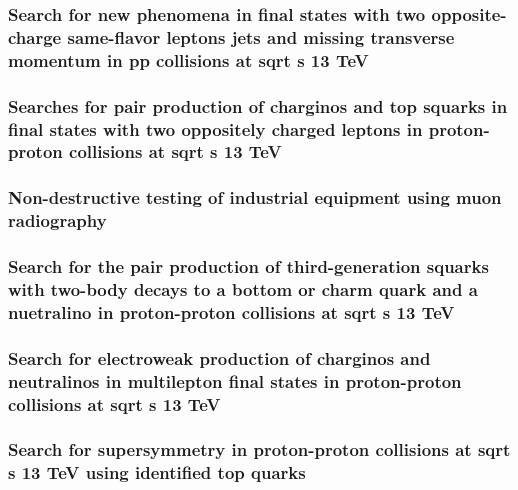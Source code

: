\documentclass[a4paper, 11pt, twoside, openright]{report}
\begin{document}
\subsubsection{Search for new phenomena in final states with two opposite-charge same-flavor leptons jets and missing transverse momentum in pp collisions at sqrt s 13 TeV}

\subsubsection{Searches for pair production of charginos and top squarks in final states with two oppositely charged leptons in proton-proton collisions at sqrt s 13 TeV}

\subsubsection{Non-destructive testing of industrial equipment using muon radiography}

\subsubsection{Search for the pair production of third-generation squarks with two-body decays to a bottom or charm quark and a nuetralino in proton-proton collisions at sqrt s 13 TeV}

\subsubsection{Search for electroweak production of charginos and neutralinos in multilepton final states in proton-proton collisions at sqrt s 13 TeV}

\subsubsection{Search for supersymmetry in proton-proton collisions at sqrt s 13 TeV using identified top quarks}

\end{document}
